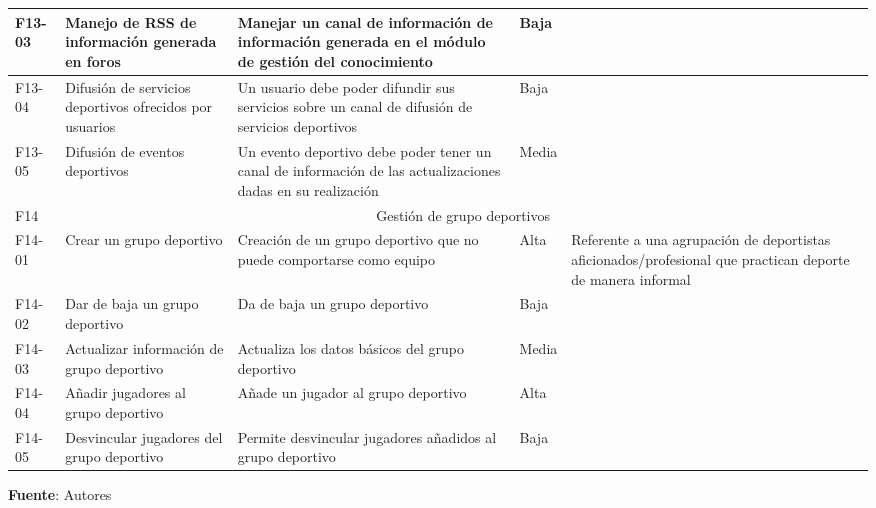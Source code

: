 \begin{center}
\begin{longtable}{|p{1.5cm}|p{3cm}|p{5cm}|p{2cm}|p{3cm}|}
			\hline
			F13-03 & 
			Manejo de RSS de información generada en foros &
			Manejar un canal de información de información generada en el módulo de gestión del conocimiento &
			Baja & 
			\\
			\hline
			F13-04 & 
			Difusión de servicios deportivos ofrecidos por usuarios &
			Un usuario debe poder difundir sus servicios sobre un canal de difusión de servicios deportivos &
			Baja & 
			\\
			\hline
			F13-05 & 
			Difusión de eventos deportivos &
			Un evento deportivo debe poder tener un canal de información de las actualizaciones dadas en su realización &
			Media & 
			\\
			\hline
			F14 &
			\multicolumn{4}{c|}{Gestión de grupo deportivos} \\
			\hline
			F14-01 &	
			Crear un grupo deportivo &
			Creación de un grupo deportivo que no puede comportarse como equipo &
			Alta &
			Referente a una agrupación de deportistas aficionados/profesional que practican deporte de manera informal
			\\
			\hline
			F14-02 &
			Dar de baja un grupo deportivo &
			Da de baja un grupo deportivo &
			Baja &
			\\
			\hline
			F14-03 &
			Actualizar información de grupo deportivo &
			Actualiza los datos básicos del grupo deportivo &
			Media &
			\\
			\hline
			F14-04 &
			Añadir jugadores al grupo deportivo &
			Añade un jugador al grupo deportivo &
			Alta &
			\\
			\hline
			F14-05 &
			Desvincular jugadores del grupo deportivo &
			Permite desvincular jugadores añadidos al grupo deportivo &
			Baja &
			\\
			\hline
		\end{longtable}
		\textbf{Fuente}: Autores
	\end{center}